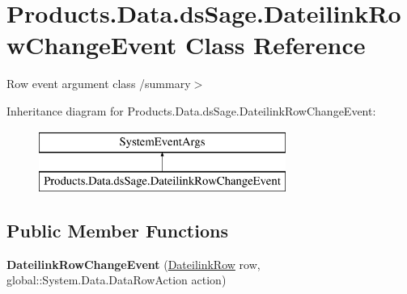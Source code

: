\hypertarget{class_products_1_1_data_1_1ds_sage_1_1_dateilink_row_change_event}{}\section{Products.\+Data.\+ds\+Sage.\+Dateilink\+Row\+Change\+Event Class Reference}
\label{class_products_1_1_data_1_1ds_sage_1_1_dateilink_row_change_event}


Row event argument class /summary$>$  


Inheritance diagram for Products.\+Data.\+ds\+Sage.\+Dateilink\+Row\+Change\+Event\+:\begin{figure}[H]
\begin{center}
\leavevmode
\includegraphics[height=2.000000cm]{class_products_1_1_data_1_1ds_sage_1_1_dateilink_row_change_event}
\end{center}
\end{figure}
\subsection*{Public Member Functions}
\begin{DoxyCompactItemize}
\item 
{\bfseries Dateilink\+Row\+Change\+Event} (\hyperlink{class_products_1_1_data_1_1ds_sage_1_1_dateilink_row}{Dateilink\+Row} row, global\+::\+System.\+Data.\+Data\+Row\+Action action)\hypertarget{class_products_1_1_data_1_1ds_sage_1_1_dateilink_row_change_event_aa7c5f5085f696d7b4f7285d9764cf415}{}\label{class_products_1_1_data_1_1ds_sage_1_1_dateilink_row_change_event_aa7c5f5085f696d7b4f7285d9764cf415}

\end{DoxyCompactItemize}

